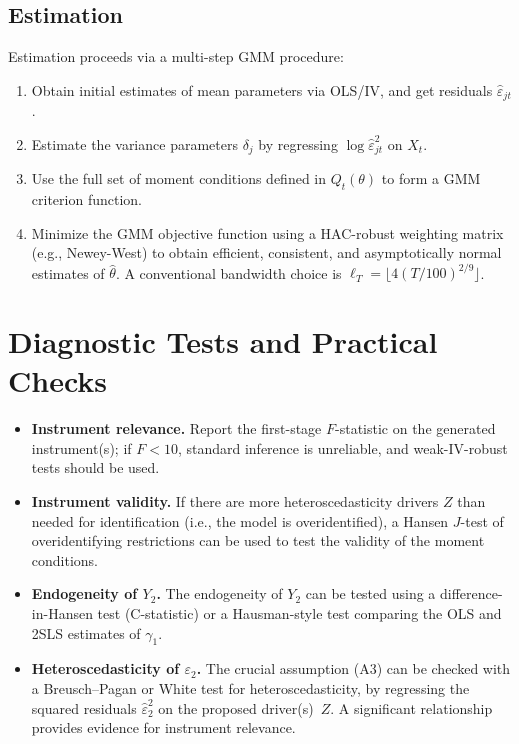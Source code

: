 \documentclass{article}
\theoremstyle{plain}
\begin{document}
\subsection{Estimation}
Estimation proceeds via a multi-step GMM procedure:
\begin{enumerate}\itemsep2pt
\item Obtain initial estimates of mean parameters via OLS/IV, and get residuals \(\hat\varepsilon_{jt}\).
\item Estimate the variance parameters \(\delta_j\) by regressing \(\log\hat\varepsilon_{jt}^2\) on \(X_t\).
\item Use the full set of moment conditions defined in \(Q_t(\theta)\) to form a GMM criterion function.
\item Minimize the GMM objective function using a HAC-robust weighting matrix (e.g., Newey-West) to obtain efficient, consistent, and asymptotically normal estimates of \(\hat\theta\). A conventional bandwidth choice is \(\ell_T=\lfloor4(T/100)^{2/9}\rfloor\).
\end{enumerate}

\section{Diagnostic Tests and Practical Checks}

\begin{itemize}\itemsep2pt
\item \textbf{Instrument relevance.}
      Report the first-stage \(F\)-statistic on the generated instrument(s); if \(F<10\), standard inference is unreliable, and weak-IV-robust tests should be used.
\item \textbf{Instrument validity.}
      If there are more heteroscedasticity drivers \(Z\) than needed for identification (i.e., the model is overidentified), a Hansen \(J\)-test of overidentifying restrictions can be used to test the validity of the moment conditions.
\item \textbf{Endogeneity of \(Y_2\).}
      The endogeneity of \(Y_2\) can be tested using a difference-in-Hansen test (C-statistic) or a Hausman-style test comparing the OLS and 2SLS estimates of \(\gamma_1\).
\item \textbf{Heteroscedasticity of \(\varepsilon_2\).}
      The crucial assumption (A3) can be checked with a Breusch–Pagan or White test for heteroscedasticity, by regressing the squared residuals \(\hat\varepsilon_2^2\) on the proposed driver(s)~\(Z\). A significant relationship provides evidence for instrument relevance.
\end{itemize}
\end{document}

